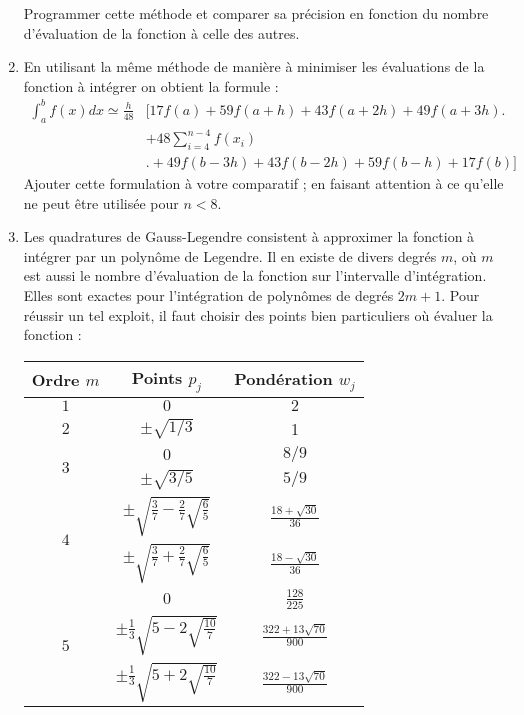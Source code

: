 \begin{enumerate}
Programmer cette méthode et comparer sa précision en fonction du nombre d'évaluation de la fonction à celle des autres. 
\item En utilisant la même méthode de manière à minimiser les évaluations de la fonction à intégrer on obtient la formule :
 \begin{equation}
\begin{split}
\int_a^b f(x)dx \simeq \frac{h}{48} &\biggl[17f(a) + 59f(a+h)+ 43f(a+2h)+ 49f(a+3h)\biggr.\\
&+48\sum_{i=4}^{n-4}f(x_i)\\
&\biggl.+49f(b-3h)+43f(b-2h)+59f(b-h)+17f(b)\biggr]
\end{split}
 \end{equation}
Ajouter cette formulation à votre comparatif ; en faisant attention à ce qu'elle ne 
peut être utilisée pour $n<8$.
\item Les quadratures de Gauss-Legendre 
consistent à approximer la fonction à intégrer 
par un polynôme de Legendre. Il en existe de divers degrés $m$, où $m$ 
est aussi le nombre d'évaluation de la fonction sur l'intervalle d'intégration.
 Elles sont
exactes pour l'intégration de polynômes de degrés $2m+1$. Pour réussir un tel 
exploit, il faut choisir des points bien particuliers où évaluer la fonction :
\begin{center}
\begin{tabular}{ccc}
Ordre $m$& Points $p_j$ &Pondération $w_j$\\
\hline\hline
\strut$1$ & $0$ & $2$ \\\hline
\strut$2$ & $\pm \sqrt{1/3}$ & 1\\\hline
\multirow{2}{*}{$3$} &  $0$              & $8/9$\\
                     & $\pm\sqrt{3/5}$   & $5/9$\\\hline
\multirow{2}{*}{$4$} &  $\pm\sqrt{\frac{3}{7}-\frac{2}{7}\sqrt{\frac{6}{5}}}$              & $\frac{18+\sqrt{30}}{36}$\\
                     &  $\pm\sqrt{\frac{3}{7}+\frac{2}{7}\sqrt{\frac{6}{5}}}$              & $\frac{18-\sqrt{30}}{36}$\\\hline
\multirow{3}{*}{$5$} & $0$ & $\frac{128}{225}$\\
                     &  $\pm\frac{1}{3}\sqrt{5-2\sqrt{\frac{10}{7}}}$ & $\frac{322+13\sqrt{70}}{900}$\\
                     &  $\pm\frac{1}{3}\sqrt{5+2\sqrt{\frac{10}{7}}}$ & $\frac{322-13\sqrt{70}}{900}$\\


\end{tabular}
\end{center}
\end{enumerate}
